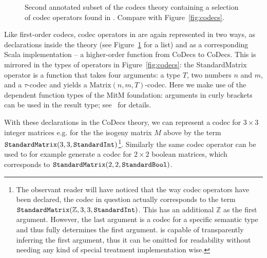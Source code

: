 \begin{figure}[ht]\centering
  \caption[List of Codec Operators]{
    Second annotated subset of the codecs theory containing a selection of codec operators found in \mmt. 
    Compare with Figure~\ref{fig:codecs}. 
  }
  \label{fig:codecops}
\end{figure}
Like first-order codecs, codec operators in \mmt are again represented in two ways, as
declarations inside the  theory (see Figure~\ref{fig:codecops} for a
list) and as a corresponding Scala implementation -- a higher-order function from CoDecs
to CoDecs. This is mirrored in the types of operators in Figure~\ref{fig:codecs}: the
\textsf{StandardMatrix} operator is a function that takes four arguments: a type $T$, two
numbers $n$ and $m$, and a $\tau$-codec and yields a $\mathrm{Matrix}(n, m,
T)$-codec. Here we make use of the dependent function types of the MitM foundation:
arguments in curly brackets can be used in the result type; see~\cite{RabKoh:WSMSML13} for
details.

With these declarations in the \textsf{CoDecs} theory, we can represent a codec for
$3 \times 3$ integer matrices e.g. for the the isogeny matrix $M$ above by the \ommt term
$\plaintt{StandardMatrix}(3, 3, \plaintt{StandardInt})$\footnote{The observant reader will
  have noticed that the way codec operators have been declared, the codec in question
  actually corresponds to the term
  $\plaintt{StandardMatrix}(\mathbb{Z}, 3, 3, \plaintt{StandardInt})$.  This has an
  additional $\mathbb{Z}$ as the first argument.  However, the last argument is a codec
  for a specific semantic type and thus fully determines the first argument.  \mmt is
  capable of transparently inferring the first argument, thus it can be omitted for
  readability without needing any kind of special treatment implementation wise.  }.
Similarly the same codec operator can be used to for example generate a codec for
$2 \times 2$ boolean matrices, which corresponds to
$\plaintt{StandardMatrix}(2, 2, \plaintt{StandardBool})$.

